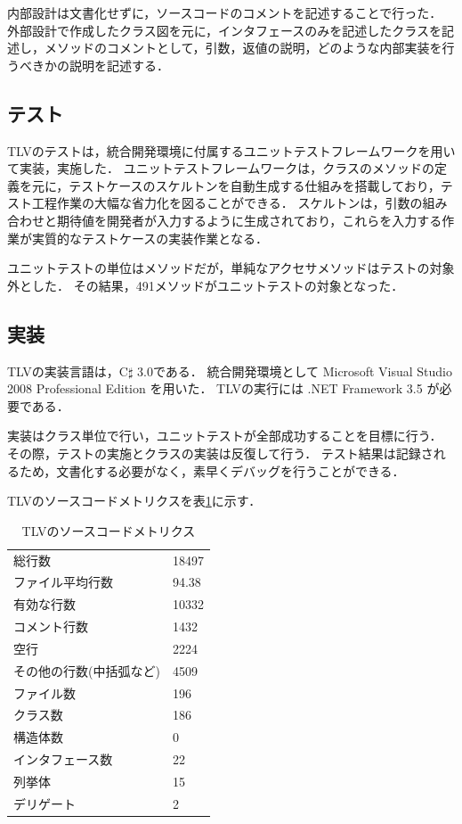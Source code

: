 内部設計は文書化せずに，ソースコードのコメントを記述することで行った．
外部設計で作成したクラス図を元に，インタフェースのみを記述したクラスを記述し，メソッドのコメントとして，引数，返値の説明，どのような内部実装を行うべきかの説明を記述する．

\subsection{テスト}

TLVのテストは，統合開発環境に付属するユニットテストフレームワークを用いて実装，実施した．
ユニットテストフレームワークは，クラスのメソッドの定義を元に，テストケースのスケルトンを自動生成する仕組みを搭載しており，テスト工程作業の大幅な省力化を図ることができる．
スケルトンは，引数の組み合わせと期待値を開発者が入力するように生成されており，これらを入力する作業が実質的なテストケースの実装作業となる．

ユニットテストの単位はメソッドだが，単純なアクセサメソッドはテストの対象外とした．
その結果，491メソッドがユニットテストの対象となった．

\subsection{実装}

TLVの実装言語は，C$\sharp$ 3.0である．
統合開発環境として Microsoft Visual Studio 2008 Professional Edition を用いた．
TLVの実行には .NET Framework 3.5 が必要である．

実装はクラス単位で行い，ユニットテストが全部成功することを目標に行う．
その際，テストの実施とクラスの実装は反復して行う．
テスト結果は記録されるため，文書化する必要がなく，素早くデバッグを行うことができる．

TLVのソースコードメトリクスを表\ref{sourceMetrics}に示す．

\begin{table}[htb]
\begin{center}
\begin{tabular}{l|l}
\hline
総行数              & 18497 \\
ファイル平均行数    & 94.38 \\
有効な行数          & 10332 \\
コメント行数        & 1432 \\
空行                & 2224 \\
その他の行数(中括弧など) & 4509 \\
ファイル数          & 196 \\
クラス数            & 186 \\
構造体数            & 0 \\
インタフェース数    & 22 \\
列挙体              & 15 \\
デリゲート          & 2 \\
\hline
\end{tabular}
\caption{TLVのソースコードメトリクス}
\label{sourceMetrics}
\end{center}
\end{table}

